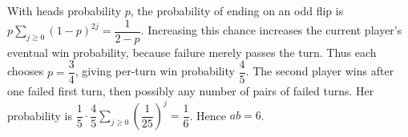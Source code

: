 With heads probability $p$, the probability of ending on an odd flip is $p\sum_{j\ge0}(1-p)^{2j}=\dfrac{1}{2-p}$. Increasing this chance increases the current player's eventual win probability, because failure merely passes the turn. Thus each chooses $p=\dfrac{3}{4}$, giving per-turn win probability $\dfrac{4}{5}$. The second player wins after one failed first turn, then possibly any number of pairs of failed turns. Her probability is $\dfrac{1}{5}\cdot\dfrac{4}{5}\sum_{j\ge0}(\dfrac{1}{25})^j=\dfrac{1}{6}$. Hence $\boxed{ab=6}$.
